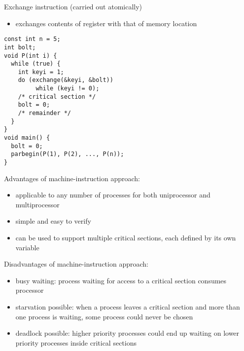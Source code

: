 \documentclass[11pt]{article}
\begin{document}
Exchange instruction (carried out atomically)
\begin{itemize}
\item exchanges contents of register with that of memory location
\end{itemize}

\begin{verbatim}
const int n = 5;
int bolt;
void P(int i) {
  while (true) {
    int keyi = 1;
    do (exchange(&keyi, &bolt))
         while (keyi != 0);
    /* critical section */
    bolt = 0;
    /* remainder */
  }
}
void main() {
  bolt = 0;
  parbegin(P(1), P(2), ..., P(n));
}
\end{verbatim}

Advantages of machine-instruction approach:
\begin{itemize}
\item applicable to any number of processes for both uniprocessor
and multiprocessor
\item simple and easy to verify
\item can be used to support multiple critical sections, each
defined by its own variable
\end{itemize}

Disadvantages of machine-instruction approach:
\begin{itemize}
\item busy waiting: process waiting for access to a critical section
consumes processor
\item starvation possible: when a process leaves a critical section
and more than one process is waiting, some process could never
be chosen
\item deadlock possible: higher priority processes could end up
waiting on lower priority processes inside critical sections
\end{itemize}
\end{document}

